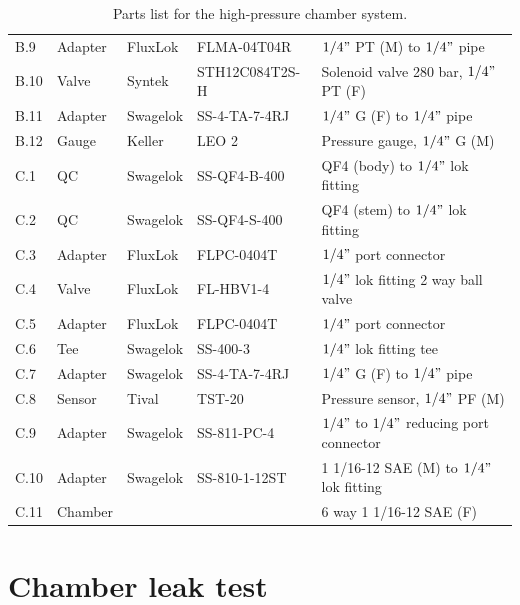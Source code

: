 \begin{table}[ht!]
\begin{tabular}{lllll}
B.9   & Adapter     & FluxLok  & FLMA-04T04R    & $1/4"$ PT (M) to $1/4"$ pipe                                           \\
B.10  & Valve       & Syntek   & STH12C084T2S-H & Solenoid valve 280 bar, $1/4"$ PT (F)                \\
B.11  & Adapter     & Swagelok & SS-4-TA-7-4RJ  & $1/4"$ G (F) to $1/4"$ pipe                           \\
B.12  & Gauge       & Keller   & LEO 2          & Pressure gauge, $1/4"$ G (M) \\
\hline
C.1   & QC          & Swagelok & SS-QF4-B-400   & QF4 (body) to $1/4"$ lok fitting                                   \\
C.2   & QC          & Swagelok & SS-QF4-S-400   & QF4 (stem) to $1/4"$ lok fitting                                   \\
C.3   & Adapter     & FluxLok  & FLPC-0404T     & $1/4"$ port connector                                              \\
C.4   & Valve       & FluxLok  & FL-HBV1-4      & $1/4"$ lok fitting 2 way ball valve      \\
C.5   & Adapter     & FluxLok  & FLPC-0404T     & $1/4"$ port connector                                              \\
C.6   & Tee   & Swagelok & SS-400-3       & $1/4"$ lok fitting tee                                             \\
C.7   & Adapter     & Swagelok & SS-4-TA-7-4RJ  & $1/4"$ G (F) to $1/4"$ pipe                           \\
C.8   & Sensor      & Tival    & TST-20         & Pressure sensor, $1/4"$ PF (M)        \\
C.9   & Adapter     & Swagelok & SS-811-PC-4    & $1/4"$ to $1/4"$ reducing port connector                               \\
C.10  & Adapter     & Swagelok & SS-810-1-12ST  & 1 1/16-12 SAE (M) to $1/4"$ lok fitting                            \\
C.11  & Chamber     &          &                & 6 way 1 1/16-12 SAE (F) \\
\hline \hline
\end{tabular}
\caption{Parts list for the high-pressure chamber system.}
\label{table:partList}
\end{table}

\pagebreak

\section{Chamber leak test}
\label{sec:ap2-2}

